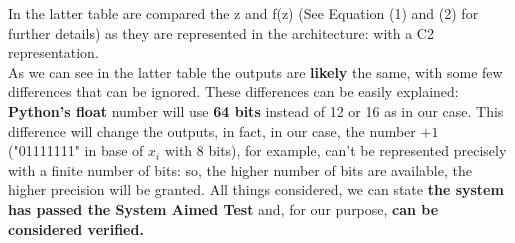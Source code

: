 In the latter table are compared the z and f(z) (See Equation (1) and (2) for further details) as they are represented in the architecture: with a C2 representation.\\ 
As we can see in the latter table the outputs are \textbf{likely} the same, with some few differences that can be ignored. These differences can be easily explained: \textbf{Python's float} number will use \textbf{64 bits} instead of 12 or 16 as in our case. This difference will change the outputs, in fact, in our case, the number $+1$ ("01111111" in base of $x_{i}$ with 8 bits), for example, can't be represented precisely with a finite number of bits: so, the higher number of bits are available, the higher precision will be granted. All things considered, we can state \textbf{the system has passed the System Aimed Test} and, for our purpose, \textbf{can be considered verified.}